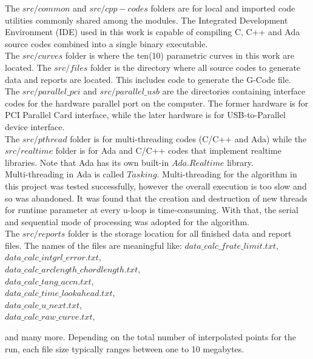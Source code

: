 The $src/common$ and $src/cpp-codes$ folders are for local and imported code utilities commonly shared among the modules. The Integrated Development Environment (IDE) used in this work is capable of compiling C, C++ and Ada source codes combined into a single binary executable.\\

The $src/curves$ folder is where the ten(10) parametric curves in this work are located. The $src/files$ folder is the directory where all source codes to generate data and reports are located. This includes code to generate the G-Code file.\\

The $src/parallel\_pci$ and $src/parallel\_usb$ are the directories containing interface codes for the hardware parallel port on the computer. The former hardware is for PCI Parallel Card interface, while the later hardware is for USB-to-Parallel device interface.  \\

The $src/pthread$ folder is for multi-threading codes (C/C++ and Ada) while the $src/realtime$ folder is for Ada and C/C++ codes that implement realtime libraries. Note that Ada has its own built-in $Ada.Realtime$ library.\\

Multi-threading in Ada is called $Tasking$. Multi-threading for the algorithm in this project was tested successfully, however the overall execution is too slow and so was abandoned. It was found that the creation and destruction of new threads for runtime parameter at every u-loop is time-consuming. With that, the serial and sequential mode of processing was adopted for the algorithm.\\ 

The $src/reports$ folder is the storage location for all finished data and report files. The names of the files are meaningful like:
\singlespacing
\noindent $data\_calc\_frate\_limit.txt$,\\ 
$data\_calc\_intgrl\_error.txt$, \\
$data\_calc\_arclength\_chordlength.txt$,\\
$data\_calc\_tang\_accn.txt$,\\
$data\_calc\_time\_lookahead.txt$,\\ 
$data\_calc\_u\_next.txt$, \\
$data\_calc\_raw\_curve.txt$,
\doublespacing

\noindent and many more. Depending on the total number of interpolated points for the run, each file size typically ranges between one to 10 megabytes.\\ 

